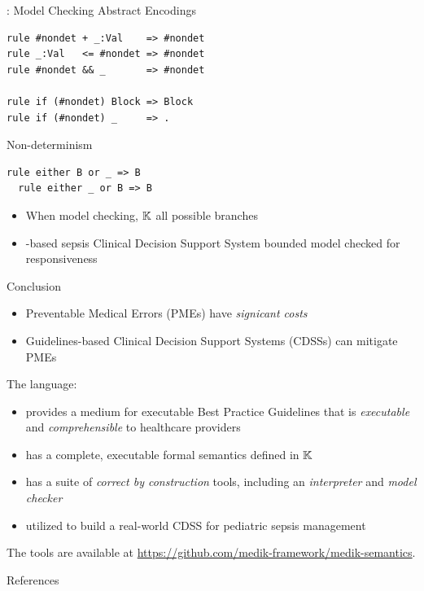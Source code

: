 \documentclass{beamer}
\begin{document}
\begin{frame}[fragile]{\MediK{}: Model Checking}
Abstract Encodings
\begin{lstlisting}[language=k,style=ksty,basicstyle=\ttfamily\tiny]
rule #nondet + _:Val    => #nondet
rule _:Val   <= #nondet => #nondet
rule #nondet && _       => #nondet

rule if (#nondet) Block => Block
rule if (#nondet) _     => .
\end{lstlisting}
\pause
Non-determinism
\begin{lstlisting}[language=medik,style=mediksty,basicstyle=\ttfamily\tiny]
  rule either B or _ => B
  rule either _ or B => B
\end{lstlisting}
\pause
\begin{itemize}
  \item When model checking, $\mathbb{K}{}$ all possible branches
  \item \MediK{}-based sepsis Clinical Decision Support System bounded model checked
    for responsiveness
\end{itemize}
\end{frame}
\begin{frame}{Conclusion}
\begin{itemize}
  \item Preventable Medical Errors (PMEs) have \emph{signicant costs}
  \item Guidelines-based Clinical Decision Support Systems (CDSSs) can mitigate PMEs
\end{itemize}
  \pause
  The \MediK{} language:
\begin{itemize}
  \item provides a medium for executable Best Practice Guidelines that is
    \emph{executable} and \emph{comprehensible} to healthcare providers
  \item has a complete, executable formal semantics defined in $\mathbb{K}{}$
  \item has a suite of \emph{correct by construction} tools, including
    an \emph{interpreter} and \emph{model checker}
  \item utilized to build a real-world CDSS for pediatric sepsis management
\end{itemize}
\begin{tiny}
  The \MediK{} tools are available at \url{https://github.com/medik-framework/medik-semantics}.
\end{tiny}

\end{frame}


\begin{frame}[allowframebreaks]{References}
  
\end{frame}
\end{document}
